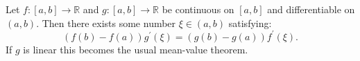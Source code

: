 \documentclass[12pt]{article}
\begin{document}
Let $f:[a,b]\to\mathbb{R}$ and $g:[a,b]\to\mathbb{R}$ be continuous on $[a,b]$ and differentiable on $(a,b)$. Then there exists some number $\xi\in(a,b)$ satisfying:
$$(f(b)-f(a))g^\prime(\xi)=(g(b)-g(a))f^\prime(\xi).$$
If $g$ is linear this becomes the usual mean-value theorem.
\end{document}
